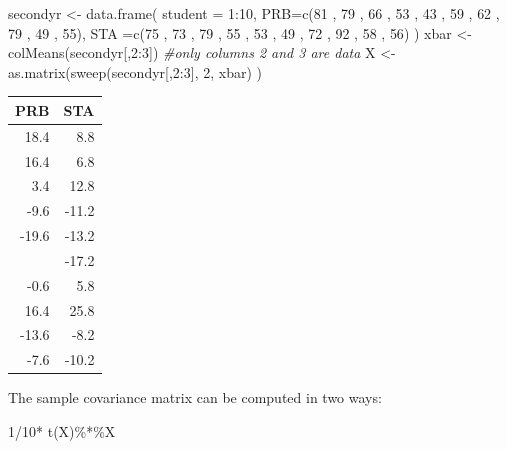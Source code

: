 \documentclass[
]{book}
\newenvironment{Shaded}{\begin{snugshade}}{\end{snugshade}}
\newcommand{\AttributeTok}[1]{\textcolor[rgb]{0.77,0.63,0.00}{#1}}
\newcommand{\CommentTok}[1]{\textcolor[rgb]{0.56,0.35,0.01}{\textit{#1}}}
\newcommand{\DecValTok}[1]{\textcolor[rgb]{0.00,0.00,0.81}{#1}}
\newcommand{\FunctionTok}[1]{\textcolor[rgb]{0.00,0.00,0.00}{#1}}
\newcommand{\NormalTok}[1]{#1}
\newcommand{\OtherTok}[1]{\textcolor[rgb]{0.56,0.35,0.01}{#1}}
\newcommand{\SpecialCharTok}[1]{\textcolor[rgb]{0.00,0.00,0.00}{#1}}
\theoremstyle{definition}
\theoremstyle{definition}
\theoremstyle{definition}
\theoremstyle{definition}
\theoremstyle{remark}
\begin{document}
\begin{Shaded}
\begin{Highlighting}[]
\NormalTok{secondyr }\OtherTok{\textless{}{-}} \FunctionTok{data.frame}\NormalTok{(}
  \AttributeTok{student =} \DecValTok{1}\SpecialCharTok{:}\DecValTok{10}\NormalTok{,}
\AttributeTok{PRB=}\FunctionTok{c}\NormalTok{(}\DecValTok{81}\NormalTok{ , }\DecValTok{79}\NormalTok{ , }\DecValTok{66}\NormalTok{ , }\DecValTok{53}\NormalTok{ , }\DecValTok{43}\NormalTok{ , }\DecValTok{59}\NormalTok{ , }\DecValTok{62}\NormalTok{ , }\DecValTok{79}\NormalTok{ , }\DecValTok{49}\NormalTok{ , }\DecValTok{55}\NormalTok{),}
\AttributeTok{STA =}\FunctionTok{c}\NormalTok{(}\DecValTok{75}\NormalTok{ , }\DecValTok{73}\NormalTok{ , }\DecValTok{79}\NormalTok{ , }\DecValTok{55}\NormalTok{ , }\DecValTok{53}\NormalTok{ , }\DecValTok{49}\NormalTok{ , }\DecValTok{72}\NormalTok{ , }\DecValTok{92}\NormalTok{ , }\DecValTok{58}\NormalTok{ , }\DecValTok{56}\NormalTok{)}
\NormalTok{        )}
\NormalTok{xbar }\OtherTok{\textless{}{-}} \FunctionTok{colMeans}\NormalTok{(secondyr[,}\DecValTok{2}\SpecialCharTok{:}\DecValTok{3}\NormalTok{]) }\CommentTok{\#only columns 2 and 3 are data}
\NormalTok{X }\OtherTok{\textless{}{-}} \FunctionTok{as.matrix}\NormalTok{(}\FunctionTok{sweep}\NormalTok{(secondyr[,}\DecValTok{2}\SpecialCharTok{:}\DecValTok{3}\NormalTok{], }\DecValTok{2}\NormalTok{, xbar) ) }
\end{Highlighting}
\end{Shaded}

\begin{table}
\centering
\begin{tabular}{rr}
\toprule
PRB & STA\\
\midrule
18.4 & 8.8\\
16.4 & 6.8\\
3.4 & 12.8\\
-9.6 & -11.2\\
-19.6 & -13.2\\
\addlinespace
-3.6 & -17.2\\
-0.6 & 5.8\\
16.4 & 25.8\\
-13.6 & -8.2\\
-7.6 & -10.2\\
\bottomrule
\end{tabular}
\end{table}

The sample covariance matrix can be computed in two ways:

\begin{Shaded}
\begin{Highlighting}[]
\DecValTok{1}\SpecialCharTok{/}\DecValTok{10}\SpecialCharTok{*} \FunctionTok{t}\NormalTok{(X)}\SpecialCharTok{\%*\%}\NormalTok{X}
\end{Highlighting}
\end{Shaded}
\end{document}
